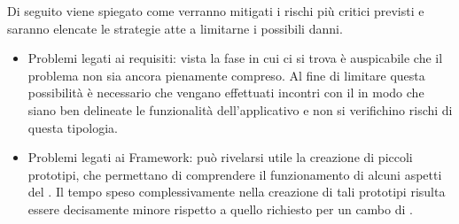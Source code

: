 \FloatBarrier
{}\label{mRisk1}
Di seguito viene spiegato come verranno mitigati i rischi più critici previsti e saranno elencate le strategie atte a limitarne i possibili danni.
\begin{itemize}
\item{Problemi legati ai requisiti:} vista la fase in cui ci si trova è auspicabile che il problema non sia ancora pienamente compreso. Al fine di limitare questa possibilità è necessario che vengano effettuati incontri con il  in modo che siano ben delineate le funzionalità dell'applicativo e non si verifichino rischi di questa tipologia.
\item{Problemi legati ai Framework:} può rivelarsi utile la creazione di piccoli prototipi, che permettano di comprendere il funzionamento di alcuni aspetti del . Il tempo speso complessivamente nella creazione di tali prototipi risulta essere decisamente minore rispetto a quello richiesto per un cambo di .
\end{itemize}
